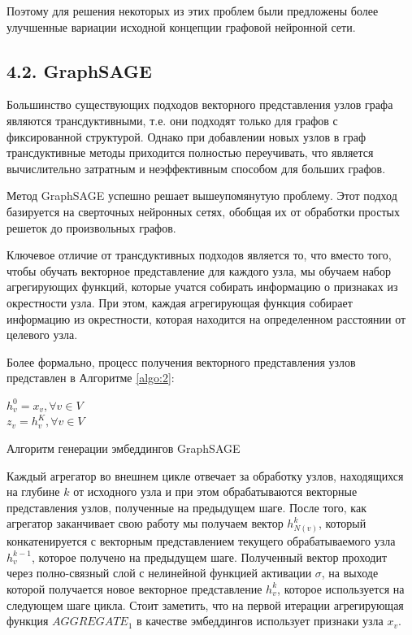 Поэтому для решения некоторых из этих проблем были предложены более улучшенные вариации исходной концепции графовой нейронной сети. 


\subsection{4.2. GraphSAGE}

Большинство существующих подходов векторного представления узлов графа являются трансдуктивными, т.е. они подходят только для графов с фиксированной структурой. Однако при добавлении новых узлов в граф трансдуктивные методы приходится полностью переучивать, что является вычислительно затратным и неэффективным способом для больших графов.

Метод GraphSAGE \cite{GraphSAGE } успешно решает вышеупомянутую проблему. Этот подход базируется на сверточных нейронных сетях, обобщая их от обработки простых решеток до произвольных графов. 

Ключевое отличие от трансдуктивных подходов является то, что вместо того, чтобы обучать векторное представление для каждого узла, мы обучаем набор агрегирующих функций, которые учатся собирать информацию о признаках из окрестности узла. При этом, каждая агрегирующая функция собирает информацию из окрестности, которая находится на определенном расстоянии от целевого узла. 

Более формально, процесс получения векторного представления узлов представлен в Алгоритме \ref{algo:2}:

\begin{algorithm}[H]
  $ h_v^0 = x_v, \forall v \in V$ \\
  $z_v = h_v^K, \forall v \in V$

    \caption{Алгоритм генерации эмбеддингов GraphSAGE}
    \label{algo:2}
\end{algorithm}

Каждый агрегатор во внешнем цикле отвечает за обработку узлов, находящихся на глубине $k$ от исходного узла и при этом обрабатываются векторные представления узлов, полученные на предыдущем шаге. После того, как агрегатор заканчивает свою работу мы получаем вектор $h_{N(v)}^k$, который конкатенируется с векторным представлением текущего обрабатываемого узла $h_v^{k-1}$, которое получено на предыдущем шаге. Полученный вектор проходит через полно-связный слой с нелинейной функцией активации $\sigma$, на выходе которой получается новое векторное представление $h_v^k$, которое используется на следующем шаге цикла.
Стоит заметить, что на первой итерации агрегирующая функция $AGGREGATE_1$ в качестве эмбеддингов использует признаки узла $x_v$.  

